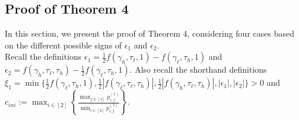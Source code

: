 
\subsection{Proof of Theorem 4}
\label{proof:Theoerm:conveccc}
In this section, we present the proof of Theorem 4, considering four cases based on the different possible signs of $\epsilon_1$ and $\epsilon_2$.\\
Recall the definitions $\epsilon_1 = \frac{1}{2} f(\gamma_h, \tau_{\ell},1) - f(\gamma_{\ell},\tau_h, 1)$ and $\epsilon_2 = f(\gamma_h, \tau_{\ell}, \tau_h) - \frac{1}{2} f(\gamma_{\ell},\tau_h, 1)$.
Also recall the shorthand definitions $\xi_1=\min\{\frac{1}{2}f(\gamma_{\ell},\tau_{h},1), \frac{1}{2}\left|f(\gamma_{\ell},\tau_{\ell},\tau_{h})\right|,\frac{1}{2}|f(\gamma_{h},\tau_{\ell},\tau_{h})|, |\epsilon_1|, |\epsilon_2|\}>0$ and $c_{ini} := \max_{i\in[2]}\left\{\frac{\max_{j\in[4]}p^{(1)}_{i,j}}{\min_{i\in[4]}p^{(1)}_{i,j}}\right\}$.


